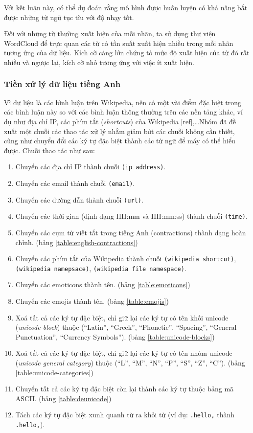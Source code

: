 Với kết luận này, có thể dự đoán rằng mô hình được huấn luyện có khả năng bắt được những từ ngữ tục tĩu với độ nhạy tốt.

Đối với những từ thường xuất hiện của mỗi nhãn, ta sử dụng thư viện WordCloud để trực quan các từ có tần suất xuất hiện nhiều trong mỗi nhãn tương ứng của dữ liệu. Kích cỡ càng lớn chứng tỏ mức độ xuất hiện của từ đó rất nhiều và ngược lại, kích cỡ nhỏ tương ứng với việc ít xuất hiện.

\subsubsection{Tiền xử lý dữ liệu tiếng Anh}\label{english-preprocess}
Vì dữ liệu là các bình luận trên Wikipedia, nên có một vài điểm đặc biệt trong các bình luận này so với các bình luận thông thường trên các nền tảng khác, ví dụ như địa chỉ IP, các phím tắt (\textit{shortcuts}) của Wikipedia [ref],\dots Nhóm đã đề xuất một chuỗi các thao tác xử lý nhằm giảm bớt các chuỗi không cần thiết, cũng như chuyển đổi các ký tự đặc biệt thành các từ ngữ để máy có thể hiểu được. Chuỗi thao tác như sau:
\begin{enumerate}
    \item Chuyển các địa chỉ IP thành chuỗi \texttt{(ip address)}.
    \item Chuyển các email thành chuỗi \texttt{(email)}.
    \item Chuyển các đường dẫn thành chuỗi \texttt{(url)}.
    \item Chuyển các thời gian (định dạng HH:mm và HH:mm:ss) thành chuỗi \texttt{(time)}.
    \item Chuyển các cụm từ viết tắt trong tiếng Anh (contractions) thành dạng hoàn chỉnh. (bảng \ref{table:english-contractions})
    \item Chuyển các phím tắt của Wikipedia thành chuỗi \texttt{(wikipedia shortcut)}, \\\texttt{(wikipedia namepsace)}, \texttt{(wikipedia file namespace)}.
    \item Chuyển các emoticons thành tên. (bảng \ref{table:emoticons})
    \item Chuyển các emojis thành tên. (bảng \ref{table:emojis})
    \item Xoá tất cả các ký tự đặc biệt, chỉ giữ lại các ký tự có tên khối unicode (\textit{unicode block}) thuộc (``Latin'', ``Greek'', ``Phonetic'', ``Spacing'', ``General Punctuation'', ``Currency Symbols''). (bảng \ref{table:unicode-blocks})
    \item Xoá tất cả các ký tự đặc biệt, chỉ giữ lại các ký tự có tên nhóm unicode (\textit{unicode general category}) thuộc (``L'', ``M'', ``N'', ``P'', ``S'', ``Z'', ``C''). (bảng \ref{table:unicode-categories})
    \item Chuyển tất cả các ký tự đặc biệt còn lại thành các ký tự thuộc bảng mã ASCII. (bảng \ref{table:deunicode})
    \item Tách các ký tự đặc biệt xunh quanh từ ra khỏi từ (ví dụ: {\tt .hello,} thành {\tt .\textvisiblespace hello\textvisiblespace,}).
\end{enumerate}

